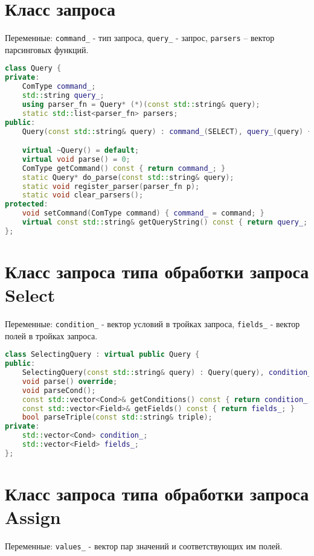 \documentclass{article}
\begin{document}
\section*{Класс запроса}

Переменные: \texttt{command\_} - тип запроса, \texttt{query\_} - запрос, \texttt{parsers} – вектор парсинговых функций.

\begin{lstlisting}[language=C++]
class Query {
private:
    ComType command_;
    std::string query_;
    using parser_fn = Query* (*)(const std::string& query);
    static std::list<parser_fn> parsers;
public:
    Query(const std::string& query) : command_(SELECT), query_(query) {}

    virtual ~Query() = default;
    virtual void parse() = 0;
    ComType getCommand() const { return command_; }
    static Query* do_parse(const std::string& query);
    static void register_parser(parser_fn p);
    static void clear_parsers();
protected:
    void setCommand(ComType command) { command_ = command; }
    virtual const std::string& getQueryString() const { return query_; }
};
\end{lstlisting}

\section*{Класс запроса типа обработки запроса Select}

Переменные: \texttt{condition\_} - вектор условий в тройках запроса, \texttt{fields\_} - вектор полей в тройках запроса.

\begin{lstlisting}[language=C++]
class SelectingQuery : virtual public Query {
public:
    SelectingQuery(const std::string& query) : Query(query), condition_(), fields_() {}
    void parse() override;
    void parseCond();
    const std::vector<Cond>& getConditions() const { return condition_; }
    const std::vector<Field>& getFields() const { return fields_; }
    bool parseTriple(const std::string& triple);
private:
    std::vector<Cond> condition_;
    std::vector<Field> fields_;
};
\end{lstlisting}

\section*{Класс запроса типа обработки запроса Assign}

Переменные: \texttt{values\_} - вектор пар значений и соответствующих им полей.
\end{document}
